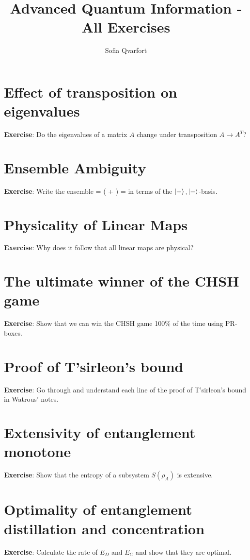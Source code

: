 


\title{Advanced Quantum Information - All Exercises}
\author{Sofia Qvarfort}
\maketitle
\tableofcontents

\section{Effect of transposition on eigenvalues}
\textbf{Exercise}: Do the eigenvalues of a matrix $A$ change under transposition $A \rightarrow A^T$?

\section{Ensemble Ambiguity}
\textbf{Exercise}: Write the ensemble 
\beq
\rho =  \left(  +  \right) = 
\eeq
in terms of the $\left| + \right\rangle, \left| - \right\rangle$-basis. 

\section{Physicality of Linear Maps}
\textbf{Exercise}: Why does it follow that all linear maps are physical? 

\section{The ultimate winner of the CHSH game}
\textbf{Exercise}: Show that we can win the CHSH game 100\% of the time using PR-boxes. 

\section{Proof of T'sirleon's bound}
\textbf{Exercise}: Go through and understand each line of the proof of T'sirleon's bound in Watrous' notes. 

\section{Extensivity of entanglement monotone}
\textbf{Exercise}: Show that the entropy of a subsystem $S(\rho_A)$ is extensive. 

\section{Optimality of entanglement distillation and concentration}
\textbf{Exercise}:  Calculate the rate of $E_D$ and $E_C$ and show that they are optimal. 

